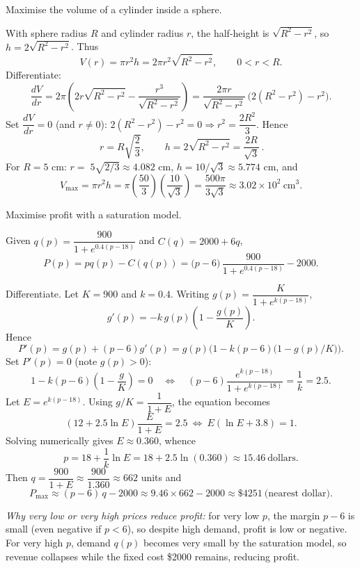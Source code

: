 \documentclass[11pt]{article}
\def\textbf#1{#1}%
\begin{document}
\begin{solution}
\textbf{Maximise the volume of a cylinder inside a sphere.}

With sphere radius \(R\) and cylinder radius \(r\), the half-height is
\(\sqrt{R^{2}-r^{2}}\), so \(h=2\sqrt{R^{2}-r^{2}}\).  
Thus
\[
V(r)=\pi r^{2}h=2\pi r^{2}\sqrt{R^{2}-r^{2}},\qquad 0<r<R.
\]
Differentiate:
\[
\frac{dV}{dr}=2\pi\!\left(2r\sqrt{R^{2}-r^{2}}-\frac{r^{3}}{\sqrt{R^{2}-r^{2}}}\right)
             =\frac{2\pi r}{\sqrt{R^{2}-r^{2}}}\,\big(2(R^{2}-r^{2})-r^{2}\big).
\]
Set \(\dfrac{dV}{dr}=0\) (and \(r\ne 0\)): \(2(R^{2}-r^{2})-r^{2}=0\Rightarrow r^{2}=\dfrac{2R^{2}}{3}\).
Hence
\[
\boxed{\,r=R\sqrt{\frac{2}{3}},\qquad 
h=2\sqrt{R^{2}-r^{2}}=\frac{2R}{\sqrt{3}}\, }.
\]
For \(R=5\) cm: \(r=\;5\sqrt{2/3}\approx 4.082\) cm, \(h=10/\sqrt{3}\approx 5.774\) cm, and
\[
V_{\max}=\pi r^{2}h=\pi\left(\frac{50}{3}\right)\!\left(\frac{10}{\sqrt{3}}\right)
=\frac{500\pi}{3\sqrt{3}}\approx 3.02\times 10^{2}\ \text{cm}^{3}.
\]
\end{solution}

\begin{solution}
\textbf{Maximise profit with a saturation model.}

Given \(q(p)=\dfrac{900}{1+e^{0.4(p-18)}}\) and \(C(q)=2000+6q\),
\[
P(p)=pq(p)-C(q(p))=\big(p-6\big)\,\frac{900}{1+e^{0.4(p-18)}}-2000.
\]

Differentiate.  Let \(K=900\) and \(k=0.4\).  Writing \(g(p)=\dfrac{K}{1+e^{k(p-18)}}\),
\[
g'(p)=-k\,g(p)\!\left(1-\frac{g(p)}{K}\right).
\]
Hence
\[
P'(p)=g(p)+(p-6)g'(p)=g(p)\Big(1-k(p-6)\big(1-g(p)/K\big)\Big).
\]
Set \(P'(p)=0\) (note \(g(p)>0\)):
\[
1-k(p-6)\!\left(1-\frac{g}{K}\right)=0
\quad\Longleftrightarrow\quad
(p-6)\frac{e^{k(p-18)}}{1+e^{k(p-18)}}=\frac{1}{k}=2.5.
\]
Let \(E=e^{k(p-18)}\).  Using \(g/K=\dfrac{1}{1+E}\), the equation becomes
\[
(12+2.5\ln E)\frac{E}{1+E}=2.5
\ \Longleftrightarrow\
E(\ln E+3.8)=1.
\]
Solving numerically gives \(E\approx 0.360\), whence
\[
p=18+\frac{1}{k}\ln E=18+2.5\ln(0.360)\approx 15.46\ \text{dollars}.
\]
Then \(q=\dfrac{900}{1+E}\approx \dfrac{900}{1.360}\approx 662\) units and
\[
P_{\max}\approx (p-6)\,q-2000 \approx 9.46\times 662-2000 \approx \$4251
\ \text{(nearest dollar)}.
\]

\emph{Why very low or very high prices reduce profit:}
for very low \(p\), the margin \(p-6\) is small (even negative if \(p<6\)), so despite high demand, profit is low or negative.  
For very high \(p\), demand \(q(p)\) becomes very small by the saturation model, so revenue collapses while the fixed cost \$2000 remains, reducing profit.
\end{solution}
\end{document}
